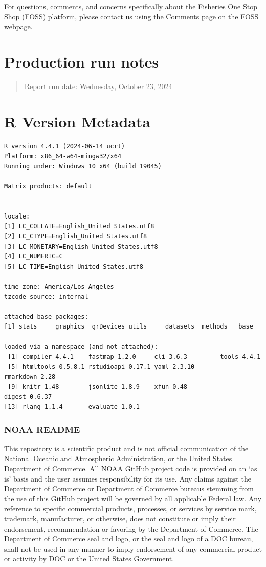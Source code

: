 \documentclass[
  letterpaper,
  oneside,
  open=any]{scrbook}
\begin{document}
For questions, comments, and concerns specifically about the
\href{https://www.fisheries.noaa.gov/foss}{Fisheries One Stop Shop
(FOSS)} platform, please contact us using the Comments page on the
\href{https://www.fisheries.noaa.gov/foss}{FOSS} webpage.

\chapter{Production run notes}\label{production-run-notes}

\begin{quote}
Report run date: Wednesday, October 23, 2024
\end{quote}

\chapter{R Version Metadata}\label{r-version-metadata}

\begin{verbatim}
R version 4.4.1 (2024-06-14 ucrt)
Platform: x86_64-w64-mingw32/x64
Running under: Windows 10 x64 (build 19045)

Matrix products: default


locale:
[1] LC_COLLATE=English_United States.utf8 
[2] LC_CTYPE=English_United States.utf8   
[3] LC_MONETARY=English_United States.utf8
[4] LC_NUMERIC=C                          
[5] LC_TIME=English_United States.utf8    

time zone: America/Los_Angeles
tzcode source: internal

attached base packages:
[1] stats     graphics  grDevices utils     datasets  methods   base     

loaded via a namespace (and not attached):
 [1] compiler_4.4.1    fastmap_1.2.0     cli_3.6.3         tools_4.4.1      
 [5] htmltools_0.5.8.1 rstudioapi_0.17.1 yaml_2.3.10       rmarkdown_2.28   
 [9] knitr_1.48        jsonlite_1.8.9    xfun_0.48         digest_0.6.37    
[13] rlang_1.1.4       evaluate_1.0.1   
\end{verbatim}

\subsection{NOAA README}\label{noaa-readme-1}

This repository is a scientific product and is not official
communication of the National Oceanic and Atmospheric Administration, or
the United States Department of Commerce. All NOAA GitHub project code
is provided on an `as is' basis and the user assumes responsibility for
its use. Any claims against the Department of Commerce or Department of
Commerce bureaus stemming from the use of this GitHub project will be
governed by all applicable Federal law. Any reference to specific
commercial products, processes, or services by service mark, trademark,
manufacturer, or otherwise, does not constitute or imply their
endorsement, recommendation or favoring by the Department of Commerce.
The Department of Commerce seal and logo, or the seal and logo of a DOC
bureau, shall not be used in any manner to imply endorsement of any
commercial product or activity by DOC or the United States Government.
\end{document}
